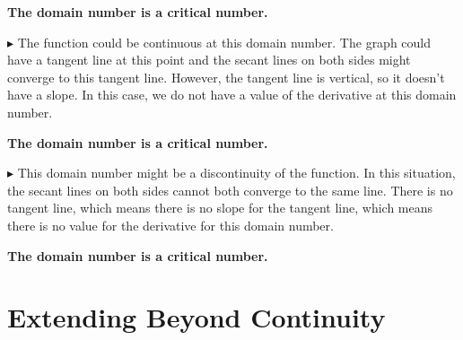 \documentclass{ximera}
\begin{document}
\begin{center}
\textbf{\textcolor{blue!55!black}{The domain number is a critical number.}}
\end{center}

\textbf{\textcolor{blue!55!black}{$\blacktriangleright$}}  The function could be continuous at this domain number. The graph could have a tangent line at this point and the secant lines on both sides might converge to this tangent line.  However, the tangent line is vertical, so it doesn't have a slope. In this case, we do not have a value of the derivative at this domain number. \\

\begin{center}
\textbf{\textcolor{blue!55!black}{The domain number is a critical number.}}
\end{center}

\textbf{\textcolor{blue!55!black}{$\blacktriangleright$}}  This domain number might be a discontinuity of the function. In this situation, the secant lines on both sides cannot both converge to the same line.  There is no tangent line, which means there is no slope for the tangent line, which means there is no value for the derivative for this domain number. \\

\begin{center}
\textbf{\textcolor{blue!55!black}{The domain number is a critical number.}}
\end{center}











































\section*{Extending Beyond Continuity} 
\end{document}
